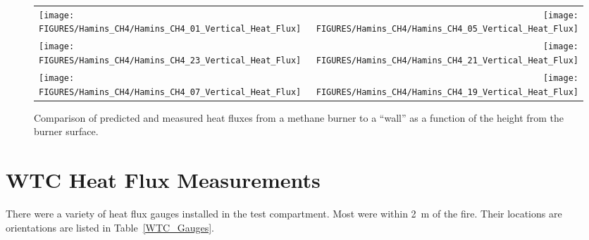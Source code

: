 \begin{figure}[p]
\begin{tabular*}{\textwidth}{l@{\extracolsep{\fill}}r}
\texttt{[image: FIGURES/Hamins\_CH4/Hamins\_CH4\_01\_Vertical\_Heat\_Flux]} &
\texttt{[image: FIGURES/Hamins\_CH4/Hamins\_CH4\_05\_Vertical\_Heat\_Flux]} \\
\texttt{[image: FIGURES/Hamins\_CH4/Hamins\_CH4\_23\_Vertical\_Heat\_Flux]} &
\texttt{[image: FIGURES/Hamins\_CH4/Hamins\_CH4\_21\_Vertical\_Heat\_Flux]} \\
\texttt{[image: FIGURES/Hamins\_CH4/Hamins\_CH4\_07\_Vertical\_Heat\_Flux]} &
\texttt{[image: FIGURES/Hamins\_CH4/Hamins\_CH4\_19\_Vertical\_Heat\_Flux]}
\end{tabular*}
\label{Hamins_CH4_Vertical}
\caption{Comparison of predicted and measured heat fluxes from a methane burner to a ``wall'' as a function of the height from the burner surface.}
\end{figure}




\clearpage

\section{WTC Heat Flux Measurements}

There were a variety of heat flux gauges installed in the test compartment. Most were within 2~m of the fire. Their locations are orientations are listed in Table~\ref{WTC_Gauges}.

